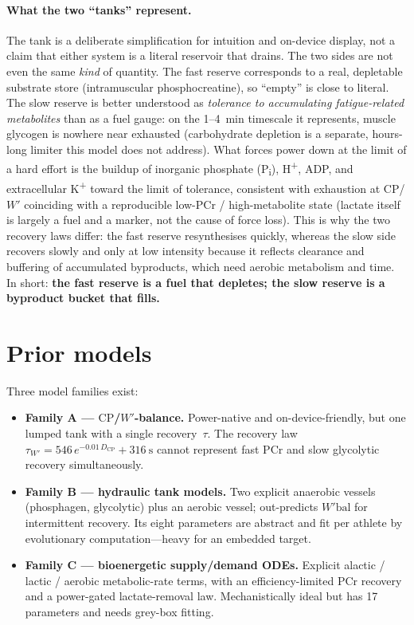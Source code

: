 \documentclass[11pt,a4paper]{article}
\newcommand{\Wp}{\ensuremath{W'}}
\newcommand{\Wbal}{\ensuremath{W'\!\text{bal}}}
\newcommand{\CP}{\ensuremath{\mathrm{CP}}}
\newcommand{\tauW}{\ensuremath{\tau_{W'}}}
\begin{document}
\paragraph{What the two ``tanks'' represent.} The tank is a deliberate simplification for intuition and
on-device display, not a claim that either system is a literal reservoir that drains. The two sides are
not even the same \emph{kind} of quantity. The fast reserve corresponds to a real, depletable substrate
store (intramuscular phosphocreatine), so ``empty'' is close to literal. The slow reserve is better
understood as \emph{tolerance to accumulating fatigue-related metabolites} than as a fuel gauge: on the
1--4~min timescale it represents, muscle glycogen is nowhere near exhausted (carbohydrate depletion is a
separate, hours-long limiter this model does not address). What forces power down at the limit of a hard
effort is the buildup of inorganic phosphate (P\textsubscript{i}), H\textsuperscript{+}, ADP, and
extracellular K\textsuperscript{+} toward the limit of tolerance, consistent with exhaustion at \CP/\Wp{}
coinciding with a reproducible low-PCr / high-metabolite state (lactate itself is largely a fuel and a
marker, not the cause of force loss). This is why the two recovery laws differ: the fast reserve
resynthesises quickly, whereas the slow side recovers slowly and only at low intensity because it reflects
clearance and buffering of accumulated byproducts, which need aerobic metabolism and time. In short:
\textbf{the fast reserve is a fuel that depletes; the slow reserve is a byproduct bucket that fills.}

\section{Prior models}\label{sec:prior}

Three model families exist:

\begin{itemize}[leftmargin=1.4em,itemsep=2pt]
\item \textbf{Family A --- \CP/\Wp-balance.}\citep{Skiba2012,Skiba2015,Bartram2018} Power-native and
on-device-friendly, but one lumped tank with a single recovery~$\tau$. The recovery law
$\tauW = 546\,e^{-0.01\,D_{\CP}} + 316~\mathrm{s}$ cannot represent fast PCr and slow glycolytic recovery
simultaneously.
\item \textbf{Family B --- hydraulic tank models.}\citep{Morton1986,Weigend2021} Two explicit anaerobic
vessels (phosphagen, glycolytic) plus an aerobic vessel; out-predicts \Wbal{} for intermittent recovery.
Its eight parameters are abstract and fit per athlete by evolutionary computation---heavy for an embedded
target.
\item \textbf{Family C --- bioenergetic supply/demand ODEs.}\citep{Chorzempa2023} Explicit alactic /
lactic / aerobic metabolic-rate terms, with an efficiency-limited PCr recovery and a power-gated
lactate-removal law. Mechanistically ideal but has 17 parameters and needs grey-box fitting.
\end{itemize}
\end{document}
